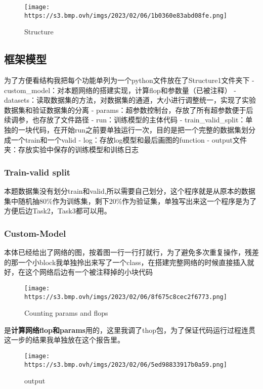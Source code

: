 \begin{figure}
\centering
\texttt{[image: https://s3.bmp.ovh/imgs/2023/02/06/1b0360e83abd08fe.png]}
\caption{Structure}
\end{figure}

\hypertarget{ux6846ux67b6ux6a21ux578b}{%
\subsection{框架模型}\label{ux6846ux67b6ux6a21ux578b}}

为了方便看结构我把每个功能单列为一个python文件放在了Structure1文件夹下 -
custom\_model：对本题网络的搭建实现，计算flop和参数量（已被注释） -
datasets：读取数据集的方法，对数据集的通道，大小进行调整统一，实现了实验数据集和验证数据集的分离
- params：超参数控制台，存放了所有超参数便于后续调参，也存放了文件路径 -
run：训练模型的主体代码 -
train\_valid\_split：单独的一块代码，在开始run之前要单独运行一次，目的是把一个完整的数据集划分成一个train和一个valid
- log：存放log模型和最后画图的function -
output文件夹：存放实验中保存的训练模型和训练日志

\hypertarget{train-valid-split}{%
\subsubsection{Train-valid split}\label{train-valid-split}}

本题数据集没有划分train和valid,所以需要自己划分，这个程序就是从原本的数据集中随机抽80\%作为训练集，剩下20\%作为验证集，单独写出来这一个程序是为了方便后边Task2，Task3都可以用。

\hypertarget{custom-model}{%
\subsubsection{Custom-Model}\label{custom-model}}

本体已经给出了网络的图，按着图一行一行打就行，为了避免多次重复操作，残差的那一个小block我单独拎出来写了一个class，在搭建完整网络的时候直接插入就好，在这个网络后边有一个被注释掉的小块代码

\begin{figure}
\centering
\texttt{[image: https://s3.bmp.ovh/imgs/2023/02/06/8f675c8cec2f6773.png]}
\caption{Counting params and flops}
\end{figure}

是\textbf{计算网络flop和params}用的，这里我调了thop包，为了保证代码运行过程连贯这一步的结果我单独放在这个报告里。

\begin{figure}
\centering
\texttt{[image: https://s3.bmp.ovh/imgs/2023/02/06/5ed98833917b0a59.png]}
\caption{output}
\end{figure}

